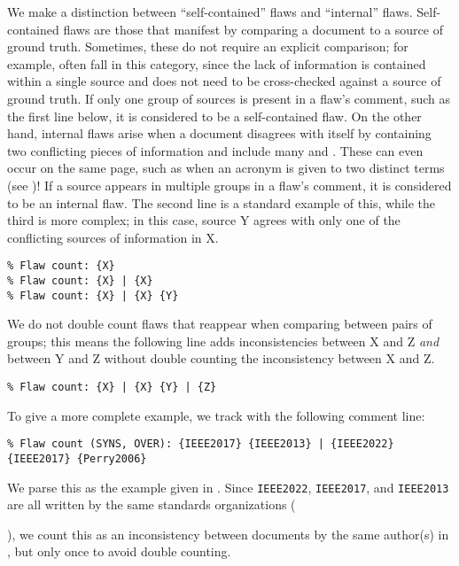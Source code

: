 We make a distinction between ``self-contained''
flaws and ``internal'' flaws. Self-contained flaws are those that manifest by
comparing a document to a source of ground truth. Sometimes, these do not
require an explicit comparison; for example, \miss{} often fall in this
category, since the lack of information is contained within a single source and
does not need to be cross-checked against a source of ground truth. If only one
group of sources is present in a flaw's comment, such as the first line
below, it is considered to be a self-contained flaw. On the other hand,
internal flaws arise when a document disagrees with itself by containing two
conflicting pieces of information and include many \contra{} and
\over{}. These can even occur on the same page, such as when an acronym
is given to two distinct terms (see )! If a
source appears in multiple groups in a flaw's comment, it is considered to
be an internal flaw. The second line is a standard example of this, while the
third is more complex; in this case, source Y agrees with only one of the
conflicting sources of information in X.
\begin{displayquote}
    \texttt{\% Flaw count: \{X\}\\\% Flaw count: \{X\} | \{X\}\\
        \% Flaw count: \{X\} | \{X\} \{Y\}}
\end{displayquote}
We do not double count flaws that reappear when comparing between pairs of
groups; this means the following line adds inconsistencies between X and Z
\emph{and} between Y and Z without double counting the inconsistency between
X and Z.
\begin{displayquote}
    \texttt{\% Flaw count: \{X\} | \{X\} \{Y\} | \{Z\}}
\end{displayquote}
To give a more complete example, we track  with the
following comment line:
\begin{displayquote}
    \texttt{\% Flaw count (SYNS, OVER): \{IEEE2017\} \{IEEE2013\} | \{IEEE2022\}
        \displayNL{} \{IEEE2017\} \{Perry2006\}}
\end{displayquote}%
We parse this as the example given in . Since
\texttt{IEEE2022}, \texttt{IEEE2017}, and \texttt{IEEE2013} are all written by
the same standards
organizations (\begin{NoHyper}\citeauthor{IEEE2022}\end{NoHyper}), we count
this as an inconsistency between documents by the same author(s) in
, but only once to avoid double counting.


